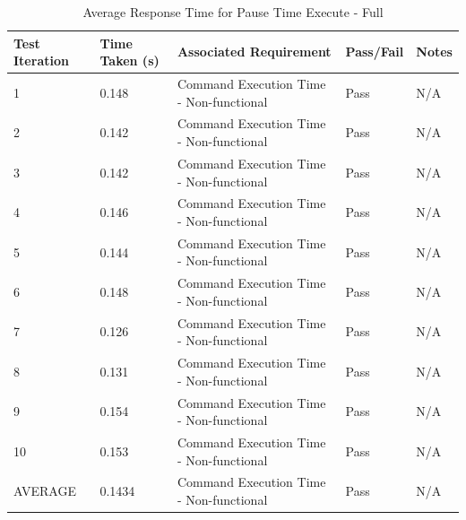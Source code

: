 \begin{table}[H]
  \centering
  \caption{Average Response Time for Pause Time Execute - Full}
  \label{tab:avgResTimeFullPTE}
  \begin{tabularx}{\linewidth}{XlXlX}
    \toprule
    Test Iteration & Time Taken (s) & Associated Requirement & Pass/Fail & Notes \\
    \midrule
    1  & 0.148 & Command Execution Time - Non-functional & Pass & N/A \\
    2  & 0.142 & Command Execution Time - Non-functional & Pass & N/A \\
    3  & 0.142 & Command Execution Time - Non-functional & Pass & N/A \\
    4  & 0.146 & Command Execution Time - Non-functional & Pass & N/A \\
    5  & 0.144 & Command Execution Time - Non-functional & Pass & N/A \\
    6  & 0.148 & Command Execution Time - Non-functional & Pass & N/A \\
    7  & 0.126 & Command Execution Time - Non-functional & Pass & N/A \\
    8  & 0.131 & Command Execution Time - Non-functional & Pass & N/A \\
    9  & 0.154 & Command Execution Time - Non-functional & Pass & N/A \\
    10 & 0.153 & Command Execution Time - Non-functional & Pass & N/A \\
    \bottomrule
    AVERAGE & 0.1434 & Command Execution Time - Non-functional & Pass & N/A \\
  \end{tabularx}
\end{table}
 
